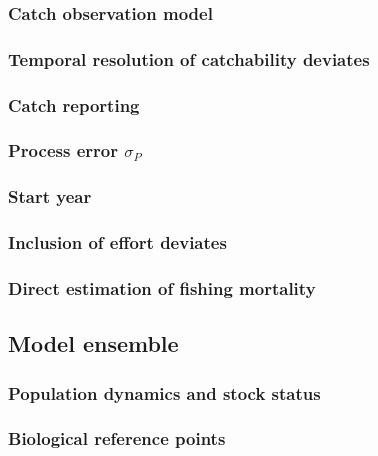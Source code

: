 \documentclass[
  11pt,
]{SCreport}
\begin{document}
\subsubsection{Catch observation model}\label{sec-res-sens-catch-obs}

\subsubsection{Temporal resolution of catchability
deviates}\label{sec-res-sens-qdev}

\subsubsection{Catch reporting}\label{sec-res-sens-catch-reporting}

\subsubsection{\texorpdfstring{Process error
\(\sigma_P\)}{Process error \textbackslash sigma\_P}}\label{sec-res-sens-process}

\subsubsection{Start year}\label{sec-res-sens-start}

\subsubsection{Inclusion of effort deviates}\label{sec-res-sens-effort}

\subsubsection{Direct estimation of fishing
mortality}\label{sec-res-sens-direct-f}

\subsection{Model ensemble}\label{model-ensemble}

\subsubsection{Population dynamics and stock
status}\label{sec-grid-stock-status}

\subsubsection{Biological reference points}\label{sec-reference-points}
\end{document}
